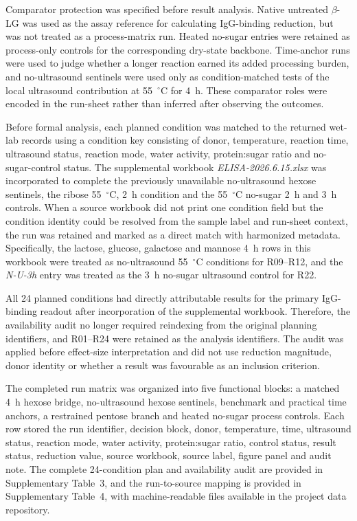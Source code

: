 Comparator protection was specified before result analysis. Native untreated
$\beta$-LG was used as the assay reference for calculating IgG-binding reduction,
but was not treated as a process-matrix run. Heated no-sugar entries were retained
as process-only controls for the corresponding dry-state backbone. Time-anchor
runs were used to judge whether a longer reaction earned its added processing
burden, and no-ultrasound sentinels were used only as condition-matched tests of
the local ultrasound contribution at 55~$^\circ$C for 4~h. These comparator roles
were encoded in the run-sheet rather than inferred after observing the outcomes.

Before formal analysis, each planned condition was matched to the returned wet-lab
records using a condition key consisting of donor, temperature, reaction time,
ultrasound status, reaction mode, water activity, protein:sugar ratio and
no-sugar-control status. The supplemental workbook \textit{ELISA-2026.6.15.xlsx}
was incorporated to complete the previously unavailable no-ultrasound hexose
sentinels, the ribose 55~$^\circ$C, 2~h condition and the 55~$^\circ$C no-sugar
2~h and 3~h controls. When a source workbook did not print one condition field
but the condition identity could be resolved from the sample label and run-sheet
context, the run was retained and marked as a direct match with harmonized
metadata. Specifically, the lactose, glucose, galactose and mannose 4~h rows in
this workbook were treated as no-ultrasound 55~$^\circ$C conditions for R09--R12,
and the \textit{N-U-3h} entry was treated as the 3~h no-sugar ultrasound control
for R22.

All 24 planned conditions had directly attributable results for the primary
IgG-binding readout after incorporation of the supplemental workbook. Therefore,
the availability audit no longer required reindexing from the original planning
identifiers, and R01--R24 were retained as the analysis identifiers. The audit was
applied before effect-size interpretation and did not use reduction magnitude,
donor identity or whether a result was favourable as an inclusion criterion.

The completed run matrix was organized into five functional blocks: a matched 4~h
hexose bridge, no-ultrasound hexose sentinels, benchmark and practical time
anchors, a restrained pentose branch and heated no-sugar process controls. Each
row stored the run identifier, decision block, donor, temperature, time,
ultrasound status, reaction mode, water activity, protein:sugar ratio, control
status, result status, reduction value, source workbook, source label, figure
panel and audit note. The complete 24-condition plan and availability audit are
provided in Supplementary Table~3, and the run-to-source mapping is provided in
Supplementary Table~4, with machine-readable files available in the project data repository.

